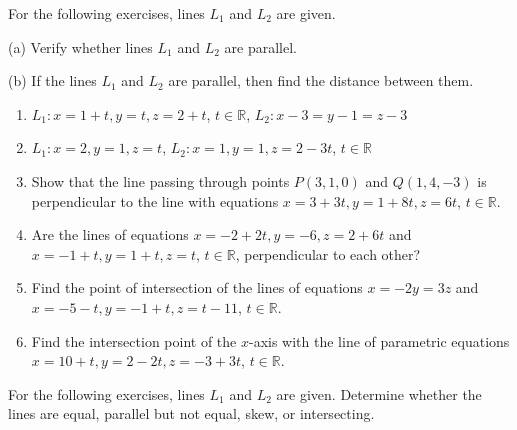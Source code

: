\documentclass{exercises}
\begin{document}
For the following exercises, lines $L_{1}$ and $L_{2}$ are given.


(a) Verify whether lines $L_{1}$ and $L_{2}$ are parallel.


(b) If the lines $L_{1}$ and $L_{2}$ are parallel, then find the distance between them.

\begin{enumerate}[resume]
\item $L_{1}:x=1+t,y=t,z=2+t$, $t\in \mathbb{R}$, $L_{2}:x-3=y-1=z-3$
\item $L_{1}:x=2,y=1,z=t$, $L_{2}:x=1,y=1,z=2-3t$, $t\in \mathbb{R}$
\item Show that the line passing through points $P(3,1,0)$ and $Q(1,4,-3)$ is perpendicular to the line with equations $x=3+3t,y=1+8t,z=6t$, $t\in \mathbb{R}$.
\item Are the lines of equations $x=-2+2t,y=-6,z=2+6t$ and $x=-1+t,y=1+t,z=t$, $t\in \mathbb{R}$, perpendicular to each other?
\item Find the point of intersection of the lines of equations $x=-2y=3z$ and $x=-5-t,y=-1+t,z=t-11$, $t\in \mathbb{R}$.
\item Find the intersection point of the $x$-axis with the line of parametric equations $x=10+t,y=2-2t,z=-3+3t$, $t\in \mathbb{R}$.
\end{enumerate}

For the following exercises, lines $L_{1}$ and $L_{2}$ are given. Determine whether the lines are equal, parallel but not equal, skew, or intersecting.
\end{document}
